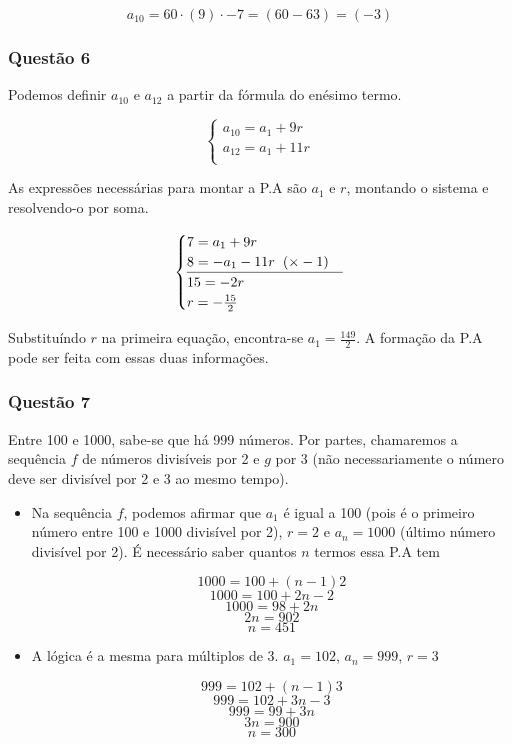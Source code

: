 \[a_{10} = 60\cdot (9)\cdot -7 = (60 - 63) = (-3)\]

\subsubsection*{Questão 6}
\hrulefill

Podemos definir $a_{10}$ e $a_{12}$ a partir da fórmula do enésimo termo.

\begin{equation*}
\begin{cases}
  a_{10} = a_{1} + 9r \\
  a_{12} = a_{1} + 11r \\
\end{cases}
\end{equation*}

As expressões necessárias para montar a P.A são $a_{1}$ e $r$, montando o sistema e resolvendo-o por soma.

\begin{equation*}
\begin{cases}
  7 = a_{1} + 9r \\
  8 = -a_{1} - 11r \hspace{0.2cm} (\times -1)\\
  \hline
  15 = -2r \\
  r = -\frac{15}{2}
\end{cases}
\end{equation*}

Substituíndo $r$ na primeira equação, encontra-se $a_{1} = \frac{149}{2}$. A formação da P.A pode ser feita com essas duas informações.

\subsubsection*{Questão 7}

\hrulefill

Entre 100 e 1000, sabe-se que há 999 números. Por partes, chamaremos a sequência $f$ de números divisíveis por 2 e $g$ por 3 (não necessariamente o número deve ser divisível por 2 e 3 ao mesmo tempo).

\begin{itemize}
  \item Na sequência $f$, podemos afirmar que $a_{1}$ é igual a 100 (pois é o primeiro número entre 100 e 1000 divisível por 2), $r = 2$ e $a_{n} = 1000$ (último número divisível por 2). É necessário saber quantos $n$ termos essa P.A tem

        \[1000 = 100 + (n - 1)2\]
        \[1000 = 100 + 2n - 2\]
        \[1000 = 98 + 2n\]
        \[2n = 902\]
        \[n = 451\]

  \item A lógica é a mesma para múltiplos de 3. $a_{1} = 102$, $a_{n} = 999$, $r = 3$

        \[999 = 102 + (n - 1)3\]
        \[999 = 102 + 3n - 3\]
        \[999 = 99 + 3n\]
        \[3n = 900\]
        \[n = 300\]
\end{itemize}


